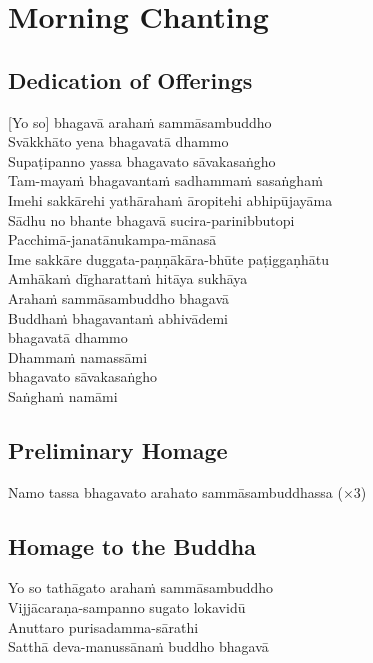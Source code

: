 \chapter{Morning Chanting}

\section*{Dedication of Offerings}

[Yo so] bhagavā arahaṁ sammāsambuddho\\
Svākkhāto yena bhagavatā dhammo\\
Supaṭipanno yassa bhagavato sāvakasaṅgho\\
Tam-mayaṁ bhagavantaṁ sadhammaṁ sasaṅghaṁ\\
Imehi sakkārehi yathārahaṁ āropitehi abhipūjayāma\\
Sādhu no bhante bhagavā sucira-parinibbutopi\\
Pacchimā-janatānukampa-mānasā\\
Ime sakkāre duggata-paṇṇākāra-bhūte paṭiggaṇhātu\\
Amhākaṁ dīgharattaṁ hitāya sukhāya\\
Arahaṁ sammāsambuddho bhagavā\\
Buddhaṁ bhagavantaṁ abhivādemi\\\relax
[Svākkhāto] bhagavatā dhammo\\
Dhammaṁ namassāmi\\\relax
[Supaṭipanno] bhagavato sāvakasaṅgho\\
Saṅghaṁ namāmi

\section*{Preliminary Homage}

\begin{leader}
\end{leader}

Namo tassa bhagavato arahato sammāsambuddhassa (×3)

\section*{Homage to the Buddha}

\begin{leader}
\end{leader}

Yo so tathāgato arahaṁ sammāsambuddho\\
Vijjācaraṇa-sampanno sugato lokavidū\\
Anuttaro purisadamma-sārathi\\
Satthā deva-manussānaṁ buddho bhagavā

